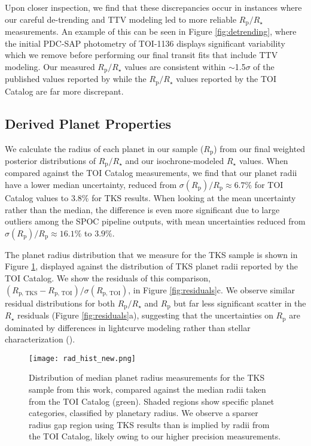 \documentclass[twocolumn]{aastex63}
\begin{document}
Upon closer inspection, we find that these discrepancies occur in instances where our careful de-trending and TTV modeling led to more reliable $R_\textrm{p}/R_{\star}$ measurements. An example of this can be seen in Figure \ref{fig:detrending}, where the initial PDC-SAP photometry of TOI-1136 displays significant variability which we remove before performing our final transit fits that include TTV modeling. Our measured $R_\textrm{p}/R_{\star}$ values are consistent within $\sim$1.5$\sigma$ of the published values reported by \citealt{Dai22} while the $R_\textrm{p}/R_{\star}$ values reported by the TOI Catalog are far more discrepant.

\subsection{Derived Planet Properties}
\label{sec:derived}

We calculate the radius of each planet in our sample ($R_\textrm{p}$) from our final weighted posterior distributions of $R_\textrm{p}/R_\star$ and our isochrone-modeled $R_\star$ values. When compared against the TOI Catalog measurements, we find that our planet radii have a lower median uncertainty, reduced from $\sigma(R_\textrm{p})/R_\textrm{p} \approx 6.7\%$ for TOI Catalog values to $3.8\%$ for TKS results. When looking at the mean uncertainty rather than the median, the difference is even more significant due to large outliers among the SPOC pipeline outputs, with mean uncertainties reduced from $\sigma(R_\textrm{p})/R_\textrm{p} \approx 16.1\%$ to $3.9\%$.

The planet radius distribution that we measure for the TKS sample is shown in Figure \ref{fig:plrad_hist}, displayed against the distribution of TKS planet radii reported by the TOI Catalog. We show the residuals of this comparison, $(R_\textrm{p, TKS} - R_\textrm{p, TOI})/\sigma(R_\textrm{p, TOI})$, in Figure \ref{fig:residuals}c. We observe similar residual distributions for both $R_\textrm{p}/R_\star$ and $R_\textrm{p}$ but far less significant scatter in the $R_{\star}$ residuals (Figure \ref{fig:residuals}a), suggesting that the uncertainties on $R_\textrm{p}$ are dominated by differences in lightcurve modeling rather than stellar characterization (\citealt{Petigura20}).

\begin{figure}[ht]
\centering
\texttt{[image: rad\_hist\_new.png]}
\caption{Distribution of median planet radius measurements for the TKS sample from this work, compared against the median radii taken from the TOI Catalog (green). Shaded regions show specific planet categories, classified by planetary radius. We observe a sparser radius gap region using TKS results than is implied by radii from the TOI Catalog, likely owing to our higher precision measurements.}
\label{fig:plrad_hist}
\end{figure}
\end{document}
